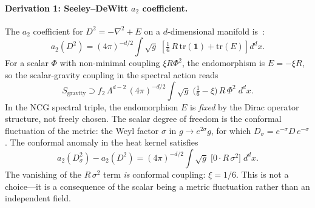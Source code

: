 \paragraph{Derivation 1: Seeley--DeWitt $a_2$ coefficient.}
The $a_2$ coefficient for $D^2 = -\nabla^2 + E$ on a $d$-dimensional manifold is~\cite{ch4:Gilkey1984}:
\begin{equation}
  a_2(D^2) = (4\pi)^{-d/2} \int \sqrt{g}\;\left[\tfrac{1}{6}\, R\, \mathrm{tr}(\mathbf{1}) + \mathrm{tr}(E)\right] d^d x.
  \label{eq:4-68}
\end{equation}
For a scalar $\Phi$ with non-minimal coupling $\xi R \Phi^2$, the endomorphism is $E = -\xi R$, so the scalar-gravity coupling in the spectral action reads
\begin{equation}
  S_{\mathrm{gravity}} \supset f_2\, \Lambda^{d-2}\, (4\pi)^{-d/2} \int \sqrt{g}\;\bigl(\tfrac{1}{6} - \xi\bigr)\, R\, \Phi^2\; d^d x.
  \label{eq:4-69}
\end{equation}
In the NCG spectral triple, the endomorphism $E$ is \emph{fixed} by the Dirac operator structure, not freely chosen. The scalar degree of freedom is the conformal fluctuation of the metric: the Weyl factor $\sigma$ in $g \to e^{2\sigma} g$, for which $D_\sigma = e^{-\sigma} D\, e^{-\sigma}$. The conformal anomaly in the heat kernel satisfies
\begin{equation}
  a_2(D_\sigma^2) - a_2(D^2) = (4\pi)^{-d/2} \int \sqrt{g}\;\bigl[0 \cdot R\, \sigma^2\bigr]\; d^d x.
  \label{eq:4-70}
\end{equation}
The vanishing of the $R\, \sigma^2$ term \emph{is} conformal coupling: $\xi = 1/6$. This is not a choice---it is a consequence of the scalar being a metric fluctuation rather than an independent field.

